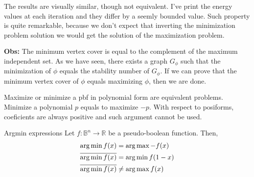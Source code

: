 The results are visually similar, though not equivalent. I've print the energy values at each iteration and they differ by a seemly bounded value. Such property is quite remarkable, because we don't expect that inverting the minimization problem solution we would get the solution of the maximization problem.

\textbf{Obs:} The minimum vertex cover is equal to the complement of the maximum independent set. As we have seen, there exists a graph $G_{\phi}$ such that the minimization of $\phi$ equals the stability number of $G_{\phi}$. If we can prove that the minimum vertex cover of $\phi$ equals maximizing $\phi$, then we are done.




Maximize or minimize a pbf in polynomial form are equivalent problems. Minimize a polynomial $p$ equals to maximize $-p$. With respect to posiforms, coeficients are always positive and such argument cannot be used.



\begin{proposition}{Argmin expressions}
Let $f:\mathbb{B}^n \rightarrow \mathbb{R}$ be a pseudo-boolean function. Then,
\begin{align*}
	\operatorname*{arg\,min}{f(x)} &= \operatorname*{arg\,max}{-f(x)} \\			
	\overline{ \operatorname*{arg\,min}{f(x)} } &= \operatorname*{arg\,min}{ f(1-x) } \\
	\overline{ \operatorname*{arg\,min}{f(x)} } & \neq \operatorname*{arg\,max}{f(x)}
\end{align*}
\end{proposition}



